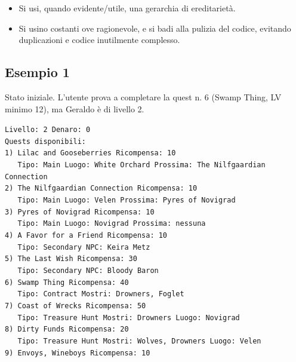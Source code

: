 \documentclass[a4paper,12pt]{article}
\begin{document}
\begin{itemize}
    \item Si usi, quando evidente/utile, una gerarchia di ereditarietà.
    \item Si usino costanti ove ragionevole, e si badi alla pulizia del codice, evitando duplicazioni e codice inutilmente complesso.
\end{itemize}

\subsection*{Esempio 1}
Stato iniziale. L'utente prova a completare la quest n. 6 (Swamp Thing, LV minimo 12), ma Geraldo è di livello 2.

\begin{tcolorbox}[colback=gray!5, colframe=gray!50]
\texttt{Livello: 2 Denaro: 0} \\
\texttt{Quests disponibili:} \\
\texttt{1) Lilac and Gooseberries Ricompensa: 10} \\
\texttt{\ \ \ Tipo: Main Luogo: White Orchard  Prossima: The Nilfgaardian Connection} \\
\texttt{2) The Nilfgaardian Connection Ricompensa: 10} \\
\texttt{\ \ \ Tipo: Main Luogo: Velen Prossima: Pyres of Novigrad} \\
\texttt{3) Pyres of Novigrad Ricompensa: 10} \\
\texttt{\ \ \ Tipo: Main Luogo: Novigrad Prossima: nessuna} \\
\texttt{4) A Favor for a Friend Ricompensa: 10} \\
\texttt{\ \ \ Tipo: Secondary NPC: Keira Metz} \\
\texttt{5) The Last Wish Ricompensa: 30} \\
\texttt{\ \ \ Tipo: Secondary NPC: Bloody Baron} \\
\texttt{6) Swamp Thing Ricompensa: 40} \\
\texttt{\ \ \ Tipo: Contract Mostri: Drowners, Foglet} \\
\texttt{7) Coast of Wrecks Ricompensa: 50} \\
\texttt{\ \ \ Tipo: Treasure Hunt Mostri: Drowners Luogo: Novigrad} \\
\texttt{8) Dirty Funds Ricompensa: 20} \\
\texttt{\ \ \ Tipo: Treasure Hunt Mostri: Wolves, Drowners Luogo: Velen} \\
\texttt{9) Envoys, Wineboys Ricompensa: 10} \\

\end{tcolorbox}
\end{document}

